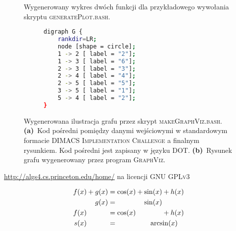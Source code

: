 
\begin{figure}[!htbp]
	\null\hfill
	\hfill\null
	\caption{
		Wygenerowany wykres dwóch funkcji dla przykładowego wywołania skryptu \textsc{generatePlot.bash}.
	}
\end{figure}


\begin{figure}[!htbp]
	\null\hfill
	\begin{subfigure}[b]{0.49\textwidth}
		\footnotesize
		\begin{lstlisting}[language=bash]
digraph G {
	rankdir=LR;
	node [shape = circle];
	1 -> 2 [ label = "2"];
	1 -> 3 [ label = "6"];
	2 -> 3 [ label = "3"];
	2 -> 4 [ label = "4"];
	2 -> 5 [ label = "5"];
	3 -> 5 [ label = "1"];
	5 -> 4 [ label = "2"];
}
		\end{lstlisting}
		\caption{}
		\label{fig:graphViz:a}
	\end{subfigure}
	\hfill
	\begin{subfigure}[b]{0.49\textwidth}
		\vspace{1em}
		\caption{}
		\label{fig:graphViz:b}
	\end{subfigure}
	\hfill\null
	\caption{
		Wygenerowana ilustracja grafu przez skrypt \textsc{makeGraphViz.bash}.
		\textbf{(a)}~Kod pośredni pomiędzy danymi wejściowymi w standardowym formacie \textsc{DIMACS Implementation Challenge} a finalnym rysunkiem. Kod pośredni jest zapisany w języku \textsc{DOT}.
		\textbf{(b)}~Rysunek grafu wygenerowany przez program \textsc{GraphViz}.
	}
	\label{fig:graphViz}
\end{figure}


\url{http://algs4.cs.princeton.edu/home/} na licencji \textsc{GNU GPLv3}


	\begin{align*}
		f(x) +    g(x)  &=          \cos(x) +              \sin(x)             + h(x) \\
		\phantom{f(x) +{}} g(x)  &= \phantom{\cos(x) +{}}          {\sin(x)} \phantom{{}+ h(x)}\\
		f(x)  \phantom{{}+ g(x)} &=          \cos(x) \phantom{{} +  \sin(x)}            + h(x) \\
		s(x)  \phantom{{}+ g(x)} &= \phantom{\cos(x) +{}} \makebox[\widthof{$\sin(x) + h(x)$}][c]{$\arcsin(x)$}
	\end{align*}